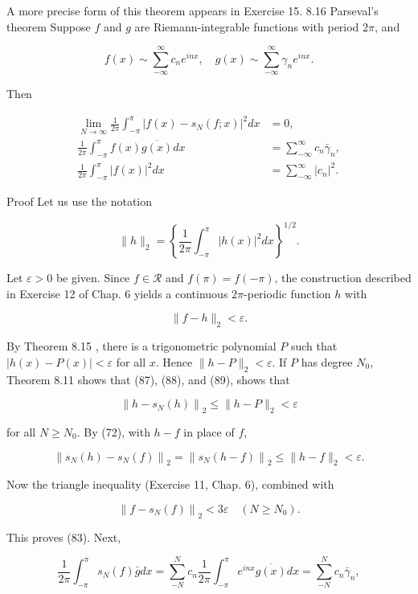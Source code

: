 \documentclass[10pt]{article}
\begin{document}
A more precise form of this theorem appears in Exercise 15. 8.16 Parseval's theorem Suppose $f$ and $g$ are Riemann-integrable functions with period $2 \pi$, and

$$
f(x) \sim \sum_{-\infty}^{\infty} c_{n} e^{i n x}, \quad g(x) \sim \sum_{-\infty}^{\infty} \gamma_{n} e^{i n x} .
$$

Then

$$
\begin{aligned}
\lim _{N \rightarrow \infty} \frac{1}{2 \pi} \int_{-\pi}^{\pi}\left|f(x)-s_{N}(f ; x)\right|^{2} d x & =0, \\
\frac{1}{2 \pi} \int_{-\pi}^{\pi} f(x) \overline{g(x)} d x & =\sum_{-\infty}^{\infty} c_{n} \bar{\gamma}_{n}, \\
\frac{1}{2 \pi} \int_{-\pi}^{\pi}|f(x)|^{2} d x & =\sum_{-\infty}^{\infty}\left|c_{n}\right|^{2} .
\end{aligned}
$$

Proof Let us use the notation

$$
\|h\|_{2}=\left\{\frac{1}{2 \pi} \int_{-\pi}^{\pi}|h(x)|^{2} d x\right\}^{1 / 2} .
$$

Let $\varepsilon>0$ be given. Since $f \in \mathscr{R}$ and $f(\pi)=f(-\pi)$, the construction described in Exercise 12 of Chap. 6 yields a continuous $2 \pi$-periodic function $h$ with

$$
\|f-h\|_{2}<\varepsilon .
$$

By Theorem 8.15 , there is a trigonometric polynomial $P$ such that $|h(x)-P(x)|<\varepsilon$ for all $x$. Hence $\|h-P\|_{2}<\varepsilon$. If $P$ has degree $N_{0}$, Theorem 8.11 shows that (87), (88), and (89), shows that

$$
\left\|h-s_{N}(h)\right\|_{2} \leq\|h-P\|_{2}<\varepsilon
$$

for all $N \geq N_{0}$. By (72), with $h-f$ in place of $f$,

$$
\left\|s_{N}(h)-s_{N}(f)\right\|_{2}=\left\|s_{N}(h-f)\right\|_{2} \leq\|h-f\|_{2}<\varepsilon .
$$

Now the triangle inequality (Exercise 11, Chap. 6), combined with

$$
\left\|f-s_{N}(f)\right\|_{2}<3 \varepsilon \quad\left(N \geq N_{0}\right) .
$$

This proves (83). Next,

$$
\frac{1}{2 \pi} \int_{-\pi}^{\pi} s_{N}(f) \bar{g} d x=\sum_{-N}^{N} c_{n} \frac{1}{2 \pi} \int_{-\pi}^{\pi} e^{i n x} \overline{g(x)} d x=\sum_{-N}^{N} c_{n} \bar{\gamma}_{n},
$$
\end{document}
